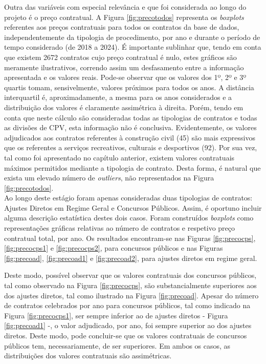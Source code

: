 Outra das variáveis com especial relevância e que foi considerada ao longo do projeto é o preço contratual. A Figura \ref{fig:precotodos} representa os \textit{boxplots} referentes aos preços contratuais para todos os contratos da base de dados, independentemente da tipologia de procedimento, por ano e durante o período de tempo considerado (de 2018 a 2024). É importante sublinhar que, tendo em conta que existem 2672 contratos cujo preço contratual é nulo, estes gráficos são meramente ilustrativos, correndo assim um desfasamento entre a informação apresentada e os valores reais. Pode-se observar que os valores dos 1º, 2º e 3º quartis tomam, sensivelmente, valores próximos para todos os anos. A distância interquartil é, aproximadamente, a mesma para os anos considerados e a distribuição dos valores é claramente assimétrica à direita. Porém, tendo em conta que neste cálculo são consideradas todas as tipologias de contratos e todas as divisões de CPV, esta informação não é conclusiva. Evidentemente, os valores adjudicados aos contratos referentes à construção civil (45) são mais expressivos que os referentes a serviços recreativos, culturais e desportivos (92). Por sua vez, tal como foi apresentado no capítulo anterior, existem valores contratuais máximos permitidos mediante a tipologia de contrato. Desta forma, é natural que exista um elevado número de \textit{outliers}, não representados na Figura \ref{fig:precotodos}. \\
Ao longo deste estágio foram apenas consideradas duas tipologias de contratos: Ajustes Diretos em Regime Geral e Concursos Públicos. Assim, é oportuno incluir alguma descrição estatística destes dois casos. Foram construídos  \textit{boxplots} como representações gráficas relativas ao número de contratos e respetivo preço contratual total, por ano. Os resultados encontram-se nas Figuras \ref{fig:precocps}, \ref{fig:precocps1} e \ref{fig:precocps2}, para concursos públicos e nas Figuras \ref{fig:precoad}, \ref{fig:precoad1} e \ref{fig:precoad2}, para ajustes diretos em regime geral. 

Deste modo, possível observar que os valores contratuais dos concursos públicos, tal como observado na Figura \ref{fig:precocps}, são substancialmente superiores aos dos ajustes diretos, tal como ilustrado na Figura \ref{fig:precoad}. Apesar do número de contratos celebrados por ano para concursos públicos, tal como indicado na Figura \ref{fig:precocps1}, ser sempre inferior ao de ajustes diretos - Figura \ref{fig:precoad1} -, o valor adjudicado, por ano, foi sempre superior ao dos ajustes diretos. Deste modo, pode concluir-se que os valores contratuais de concursos públicos tem, necessariamente, de ser superiores. Em ambos os casos, as distribuições dos valores contratuais são assimétricas. 

